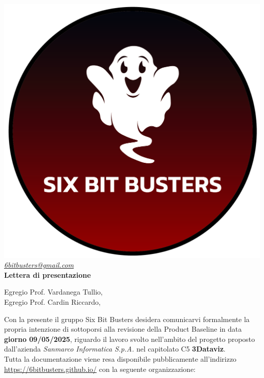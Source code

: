 \thispagestyle{empty}
\renewcommand{\arraystretch}{1.0}


\begin{titlepage}
	\begin{center}
	\includegraphics[scale = 0.5]{template/images/logo-circle.png}
	\\[1cm]
	\href{mailto:6bitbusters@gmail.com}		      	
	{\large{\textit{6bitbusters@gmail.com} } }\\[1cm]
	
	{\Huge{ \textbf{Lettera di presentazione} } }\\[1cm]
        \end{center}
        Egregio Prof. Vardanega Tullio, \\
        Egregio Prof. Cardin Riccardo,
        \newline
        
        \noindent Con la presente il gruppo Six Bit Busters desidera comunicarvi formalmente la propria
        intenzione di sottoporsi alla revisione della Product Baseline in data \textbf{giorno 09/05/2025}, riguardo il lavoro svolto nell'ambito del progetto proposto dall'azienda \textit{Sanmarco Informatica S.p.A.}
        nel capitolato C5 \textbf{3Dataviz}.\\

        \noindent Tutta la documentazione viene resa disponibile pubblicamente all'indirizzo \url{https://6bitbusters.github.io/} con la
        seguente organizzazione:


\end{titlepage}
